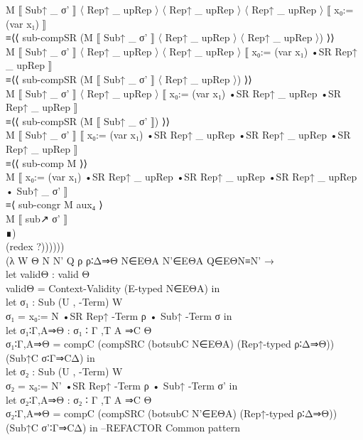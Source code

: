 {\begin{code}
{\>                           M ⟦ Sub↑ \_ σ' ⟧ 〈 Rep↑ \_ upRep 〉 〈 Rep↑ \_ upRep 〉 〈 Rep↑ \_ upRep 〉 ⟦ x₀:= (var x₁) ⟧\<\\
\>                         ≡⟨⟨ sub-compSR (M ⟦ Sub↑ \_ σ' ⟧ 〈 Rep↑ \_ upRep 〉 〈 Rep↑ \_ upRep 〉) ⟩⟩\<\\
\>                           M ⟦ Sub↑ \_ σ' ⟧ 〈 Rep↑ \_ upRep 〉 〈 Rep↑ \_ upRep 〉 ⟦ x₀:= (var x₁) •SR Rep↑ \_ upRep ⟧\<\\
\>                         ≡⟨⟨ sub-compSR (M ⟦ Sub↑ \_ σ' ⟧ 〈 Rep↑ \_ upRep 〉) ⟩⟩\<\\
\>                           M ⟦ Sub↑ \_ σ' ⟧ 〈 Rep↑ \_ upRep 〉 ⟦ x₀:= (var x₁) •SR Rep↑ \_ upRep •SR Rep↑ \_ upRep ⟧\<\\
\>                         ≡⟨⟨ sub-compSR (M ⟦ Sub↑ \_ σ' ⟧) ⟩⟩\<\\
\>                           M ⟦ Sub↑ \_ σ' ⟧ ⟦ x₀:= (var x₁) •SR Rep↑ \_ upRep •SR Rep↑ \_ upRep •SR Rep↑ \_ upRep ⟧\<\\
\>                         ≡⟨⟨ sub-comp M ⟩⟩\<\\
\>                           M ⟦ x₀:= (var x₁) •SR Rep↑ \_ upRep •SR Rep↑ \_ upRep •SR Rep↑ \_ upRep • Sub↑ \_ σ' ⟧\<\\
\>                         ≡⟨ sub-congr M aux₄ ⟩\<\\
\>                           M ⟦ sub↗ σ' ⟧\<\\
\>                           ∎) \<\\
\>                         (redex ?))))))\<\\
\>    (λ W Θ N N' Q ρ ρ∶Δ⇒Θ N∈EΘA N'∈EΘA Q∈EΘN≡N' → \<\\
\>    let validΘ : valid Θ\<\\
\>        validΘ = Context-Validity (E-typed N∈EΘA) in\<\\
\>    let σ₁ : Sub (U , -Term) W\<\\
\>        σ₁ = x₀:= N •SR Rep↑ -Term ρ • Sub↑ -Term σ in\<\\
\>    let σ₁∶Γ,A⇒Θ : σ₁ ∶ Γ ,T A ⇒C Θ\<\\
\>        σ₁∶Γ,A⇒Θ = compC (compSRC (botsubC N∈EΘA) (Rep↑-typed ρ∶Δ⇒Θ)) (Sub↑C σ∶Γ⇒CΔ) in\<\\
\>    let σ₂ : Sub (U , -Term) W\<\\
\>        σ₂ = x₀:= N' •SR Rep↑ -Term ρ • Sub↑ -Term σ' in\<\\
\>    let σ₂∶Γ,A⇒Θ : σ₂ ∶ Γ ,T A ⇒C Θ\<\\
\>        σ₂∶Γ,A⇒Θ = compC (compSRC (botsubC N'∈EΘA) (Rep↑-typed ρ∶Δ⇒Θ)) (Sub↑C σ'∶Γ⇒CΔ) in --REFACTOR Common pattern\<\\
}
\end{code}}
